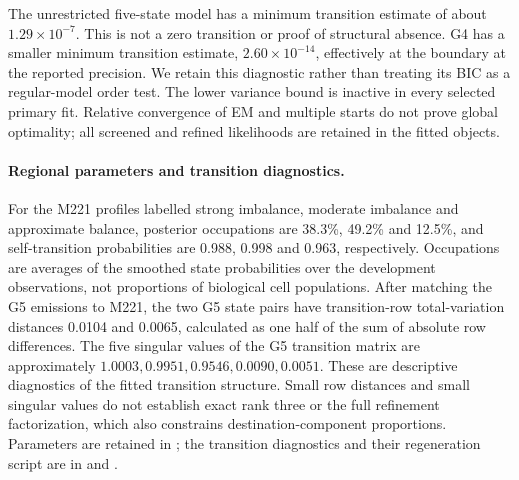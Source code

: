 \documentclass[11pt]{article}
\begin{document}


The unrestricted five-state model has a minimum transition estimate of about
$1.29\times10^{-7}$. This is not a zero transition or proof of structural
absence. G4 has a smaller minimum transition estimate,
$2.60\times10^{-14}$, effectively at the boundary at the reported precision.
We retain this diagnostic rather than treating its BIC as a regular-model
order test. The lower variance bound is inactive in every selected primary fit.
Relative convergence of EM and multiple starts do not prove global optimality;
all screened and refined likelihoods are retained in the fitted objects.

\paragraph{Regional parameters and transition diagnostics.}
For the M221 profiles labelled strong imbalance, moderate imbalance and
approximate balance, posterior occupations are 38.3\%, 49.2\% and 12.5\%,
and self-transition probabilities are 0.988, 0.998 and 0.963, respectively.
Occupations are averages of the smoothed state probabilities over the
development observations, not proportions of biological cell populations.
After matching the G5 emissions to M221, the two G5 state pairs have
transition-row total-variation distances 0.0104 and 0.0065, calculated as
one half of the sum of absolute row differences. The five singular values
of the G5 transition matrix are approximately
$1.0003,0.9951,0.9546,0.0090,0.0051$.
These are descriptive diagnostics of the fitted transition structure.
Small row distances and small singular values do not establish exact
rank three or the full refinement factorization, which also constrains
destination-component proportions. Parameters are retained in
; the transition
diagnostics and their regeneration script are in
 and
.
\end{document}
